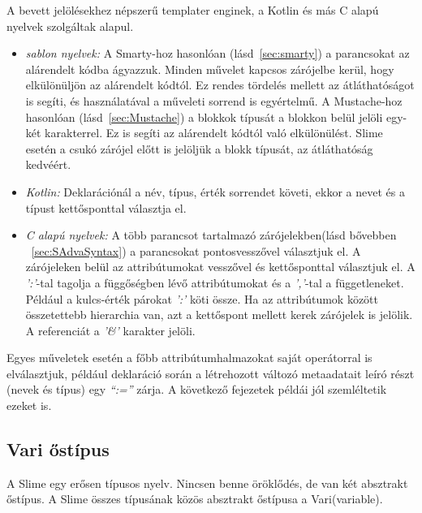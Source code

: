 A bevett jelölésekhez népszerű templater enginek, a Kotlin és más C alapú nyelvek szolgáltak alapul.
\begin{itemize}
\item \emph{sablon nyelvek:}
A Smarty-hoz hasonlóan (lásd~\ref{sec:smarty}) a parancsokat az alárendelt kódba ágyazzuk.
Minden művelet kapcsos zárójelbe kerül, hogy elkülönüljön az alárendelt kódtól.
Ez rendes tördelés mellett az átláthatóságot is segíti, és használatával a műveleti sorrend is egyértelmű. 
A Mustache-hoz hasonlóan (lásd~\ref{sec:Mustache}) a blokkok típusát a blokkon belül jelöli egy-két karakterrel.
Ez is segíti az alárendelt kódtól való elkülönülést.
Slime esetén a csukó zárójel előtt is jelöljük a blokk típusát, az átláthatóság kedvéért.
\item \emph{Kotlin:}
Deklarációnál a név, típus, érték sorrendet követi, ekkor a nevet és a típust kettősponttal választja el.
\item \emph{C alapú nyelvek:}
A több parancsot tartalmazó zárójelekben(lásd bővebben ~\ref{sec:SAdvaSyntax}) a parancsokat pontosvesszővel választjuk el.
A zárójeleken belül az attribútumokat vesszővel és kettősponttal választjuk el.
A \textit{':'}-tal tagolja a függőségben lévő attribútumokat és a \textit{','}-tal a függetleneket. 
Például a kulcs-érték párokat \textit{':'} köti össze.
Ha az attribútumok között összetettebb hierarchia van, azt a kettőspont mellett kerek zárójelek is jelölik. 
A referenciát a \textit{'\&'} karakter jelöli.
\end{itemize} 
Egyes műveletek esetén a főbb attribútumhalmazokat saját operátorral is elválasztjuk, például deklaráció során a létrehozott változó metaadatait leíró részt (nevek és típus) egy \textit{“:=”} zárja.
A következő fejezetek példái jól szemléltetik ezeket is.

\subsection{Vari őstípus}
\label{sec:SVariSuper}
A Slime egy erősen típusos nyelv.
Nincsen benne öröklődés, de van két absztrakt őstípus.
A Slime összes típusának közös absztrakt őstípusa a Vari(variable).

